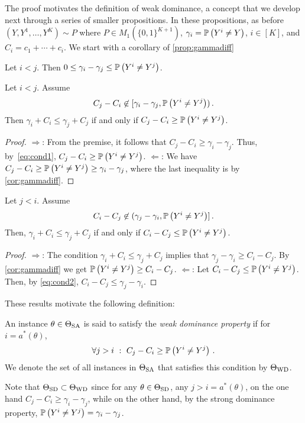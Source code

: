 The proof motivates the definition of weak dominance, a concept that we develop next through a series of smaller
propositions. In these propositions, as before $(Y,Y^1,\dots,Y^K) \sim P$ where $P\in M_1(\{0,1\}^{K+1})$,
 $\gamma_i = \mathbb{P}\left(Y^i \ne Y\right)$, $i\in [K]$, and $C_i = c_1 + \cdots + c_i$.
We start with a corollary of \cref{prop:gammadiff}
\begin{cor}
\label{cor:gammadiff}
Let $i<j$. Then $0\le \gamma_i -\gamma_j \le \mathbb{P}\left(Y^i\ne Y^j\right)$.
\end{cor}
\begin{prop}
\label{prop:ilej}
Let $i<j$. Assume 
\begin{align}
\label{eq:cond1}
C_j - C_i \not\in [\gamma_i - \gamma_j, \mathbb{P}\left(Y^i\ne Y^j\right) )\,.
\end{align}
Then $\gamma_i + C_i \le \gamma_j + C_j$ if and only if $C_j - C_i \ge \mathbb{P}\left(Y^i\ne Y^j\right)$.
\end{prop}
\begin{proof}
\noindent $\Rightarrow$: From the premise, it follows that $C_j - C_i \ge \gamma_i - \gamma_j$.
Thus, by~\eqref{eq:cond1}, $C_j - C_i \ge \mathbb{P}\left(Y^i\ne Y^j\right)$.
\noindent $\Leftarrow$: We have $C_j - C_i \ge \mathbb{P}\left(Y^i \ne Y^j\right) \ge \gamma_i -\gamma_j$, where the last
inequality is by \cref{cor:gammadiff}.
\end{proof}
\begin{prop}
\label{prop:jlei}
Let $j<i$. Assume
\begin{align}
\label{eq:cond2}
C_i - C_j \not\in (\gamma_j - \gamma_i, \mathbb{P}\left(Y^i \ne Y^j\right) ]\,.
\end{align}
Then, $\gamma_i + C_i \le \gamma_j + C_j$ if and only if $C_i - C_j \le \mathbb{P}\left(Y^i \ne Y^j\right)$.
\end{prop}
\begin{proof}
\noindent $\Rightarrow$: The condition $\gamma_i + C_i \le \gamma_j + C_j$ implies that $\gamma_j -\gamma_i \ge C_i - C_j$.
By \cref{cor:gammadiff} we get $\mathbb{P}\left(Y^i \ne Y^j\right) \ge C_i - C_j$.
\noindent $\Leftarrow$: Let $C_i - C_j \le \mathbb{P}\left(Y^i \ne Y^j\right)$. Then, by \eqref{eq:cond2}, $C_i - C_j \le \gamma_j - \gamma_i$.
\end{proof}
These results motivate the following definition:
\begin{defi}
	\label{dfn:WDP}
	An instance $\theta \in \Theta_{\mathrm{SA}}$  is said to satisfy the \emph{weak dominance property} if 
	for $i = a^*(\theta)$,
	\begin{align}
	\label{eq:wd} \forall j>i\,\,: \,\, C_j - C_i \ge \mathbb{P}\left(Y^i\ne Y^j\right)\,.
	\end{align}
We denote the set of all instances in $\Theta_{\mathrm{SA}}$ that satisfies this condition by $\Theta_{\mathrm{WD}}$.	
\end{defi}
Note that $\Theta_{\mathrm{SD}}\subset \Theta_{\mathrm{WD}}$ since for any $\theta\in \Theta_{\mathrm{SD}}$, any $j>i = a^*(\theta)$, on the one hand $C_j - C_i \ge \gamma_i - \gamma_j$, while on the other hand, by the strong dominance property, $\mathbb{P}\left(Y^i\ne Y^j\right) = \gamma_i - \gamma_j$.

